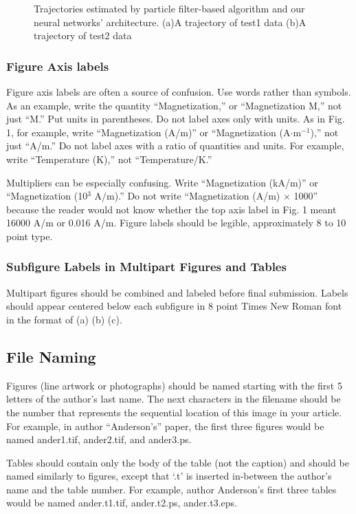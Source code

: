 \documentclass{ieeeaccess}
\begin{document}
\begin{figure}[h]
\begin{subfigure}[b]{.25\textwidth}
		\label{fig:trajectory2} 	
		\caption{}
	\end{subfigure}
	\caption{Trajectories estimated by particle filter-based algorithm and our neural networks' architecture. (a)A trajectory of test1 data (b)A trajectory of test2 data}
	\label{fig:trajectory}
\end{figure}


\subsubsection{Figure Axis labels }
Figure axis labels are often a source of confusion. Use words rather than 
symbols. As an example, write the quantity ``Magnetization,'' or 
``Magnetization M,'' not just ``M.'' Put units in parentheses. Do not label 
axes only with units. As in Fig. 1, for example, write ``Magnetization 
(A/m)'' or ``Magnetization (A$\cdot$m$^{-1}$),'' not just ``A/m.'' Do not label axes with a ratio of quantities and 
units. For example, write ``Temperature (K),'' not ``Temperature/K.'' 

Multipliers can be especially confusing. Write ``Magnetization (kA/m)'' or 
``Magnetization (10$^{3}$ A/m).'' Do not write ``Magnetization 
(A/m)$\,\times\,$1000'' because the reader would not know whether the top 
axis label in Fig. 1 meant 16000 A/m or 0.016 A/m. Figure labels should be 
legible, approximately 8 to 10 point type.

\subsubsection{Subfigure Labels in Multipart Figures and Tables}
Multipart figures should be combined and labeled before final submission. 
Labels should appear centered below each subfigure in 8 point Times New 
Roman font in the format of (a) (b) (c). 

\subsection{File Naming}
Figures (line artwork or photographs) should be named starting with the 
first 5 letters of the author's last name. The next characters in the 
filename should be the number that represents the sequential 
location of this image in your article. For example, in author 
``Anderson's'' paper, the first three figures would be named ander1.tif, 
ander2.tif, and ander3.ps.

Tables should contain only the body of the table (not the caption) and 
should be named similarly to figures, except that `.t' is inserted 
in-between the author's name and the table number. For example, author 
Anderson's first three tables would be named ander.t1.tif, ander.t2.ps, 
ander.t3.eps.
\end{document}
